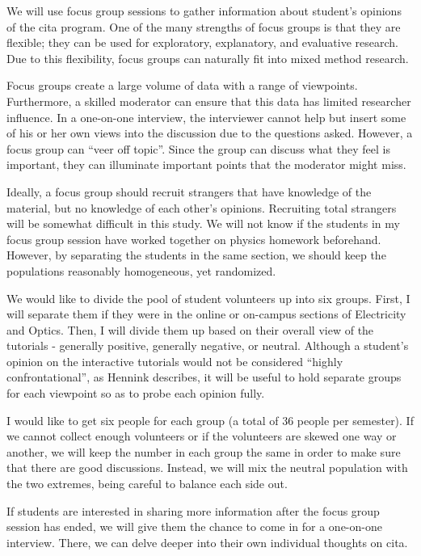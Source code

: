 We will use focus group sessions to gather information about student's opinions of the \gls{cita} program. One of the many strengths of focus groups is that they are flexible; they can be used for exploratory, explanatory, and evaluative research. Due to this flexibility, focus groups can naturally fit into mixed method research.

Focus groups create a large volume of data with a range of viewpoints. Furthermore, a skilled moderator can ensure that this data has limited researcher influence. In a one-on-one interview, the interviewer cannot help but insert some of his or her own views into the discussion due to the questions asked. However, a focus group can “veer off topic”. Since the group can discuss what they feel is important, they can illuminate important points that the moderator might miss.

Ideally, a focus group should recruit strangers that have knowledge of the material, but no knowledge of each other's opinions. Recruiting total strangers will be somewhat difficult in this study. We will not know if the students in my focus group session have worked together on physics homework beforehand. However, by separating the students in the same section, we should keep the populations reasonably homogeneous, yet randomized.

We would like to divide the pool of student volunteers up into six groups. First, I will separate them if they were in the online or on-campus sections of Electricity and Optics. Then, I will divide them up based on their overall view of the tutorials - generally positive, generally negative, or neutral. Although a student’s opinion on the interactive tutorials would not be considered “highly confrontational”, as Hennink describes, it will be useful to hold separate groups for each viewpoint so as to probe each opinion fully.

I would like to get six people for each group (a total of 36 people per semester). If we cannot collect enough volunteers or if the volunteers are skewed one way or another, we will keep the number in each group the same in order to make sure that there are good discussions. Instead, we will mix the neutral population with the two extremes, being careful to balance each side out.

If students are interested in sharing more information after the focus group session has ended, we will give them the chance to come in for a one-on-one interview. There, we can delve deeper into their own individual thoughts on \gls{cita}.

